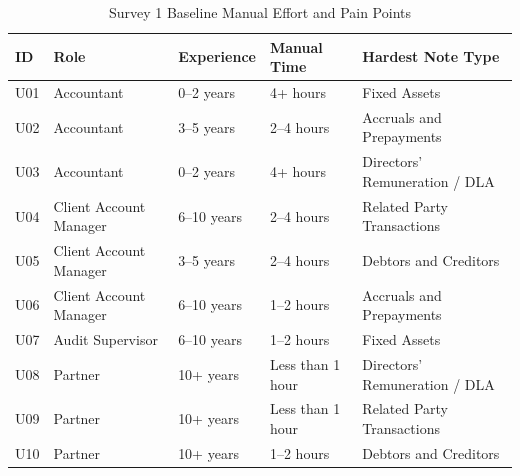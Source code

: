 \begin{table}[H]
\centering
\small
\setlength{\tabcolsep}{4pt}
\caption{Survey 1 Baseline Manual Effort and Pain Points}
\label{tab:survey1_baseline}
\begin{tabularx}{\textwidth}{l l l X X}
\toprule
\textbf{ID} & \textbf{Role} & \textbf{Experience} & \textbf{Manual Time} & \textbf{Hardest Note Type} \\
\midrule
U01 & Accountant & 0--2 years & 4+ hours & Fixed Assets \\
U02 & Accountant & 3--5 years & 2--4 hours & Accruals and Prepayments \\
U03 & Accountant & 0--2 years & 4+ hours & Directors' Remuneration / DLA \\
U04 & Client Account Manager & 6--10 years & 2--4 hours & Related Party Transactions \\
U05 & Client Account Manager & 3--5 years & 2--4 hours & Debtors and Creditors \\
U06 & Client Account Manager & 6--10 years & 1--2 hours & Accruals and Prepayments \\
U07 & Audit Supervisor & 6--10 years & 1--2 hours & Fixed Assets \\
U08 & Partner & 10+ years & Less than 1 hour & Directors' Remuneration / DLA \\
U09 & Partner & 10+ years & Less than 1 hour & Related Party Transactions \\
U10 & Partner & 10+ years & 1--2 hours & Debtors and Creditors \\
\bottomrule
\end{tabularx}
\end{table}


